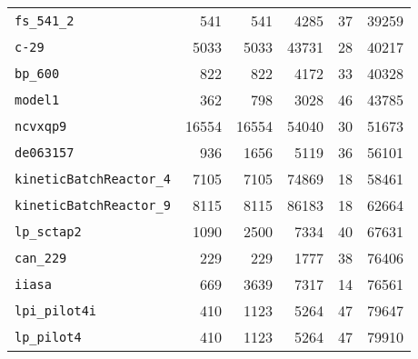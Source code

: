 \begin{table}[p]
\begin{center}
\begin{tabular}{lrrrrr}
\texttt{fs\_541\_2}&541&541&4285&37&39259\\
\texttt{c-29}&5033&5033&43731&28&40217\\
\texttt{bp\_600}&822&822&4172&33&40328\\
\texttt{model1}&362&798&3028&46&43785\\
\texttt{ncvxqp9}&16554&16554&54040&30&51673\\
\texttt{de063157}&936&1656&5119&36&56101\\
\texttt{kineticBatchReactor\_4}&7105&7105&74869&18&58461\\
\texttt{kineticBatchReactor\_9}&8115&8115&86183&18&62664\\
\texttt{lp\_sctap2}&1090&2500&7334&40&67631\\
\texttt{can\_229}&229&229&1777&38&76406\\
\texttt{iiasa}&669&3639&7317&14&76561\\
\texttt{lpi\_pilot4i}&410&1123&5264&47&79647\\
\texttt{lp\_pilot4}&410&1123&5264&47&79910\\
\hline
\end{tabular}
\end{center}
\end{table}
